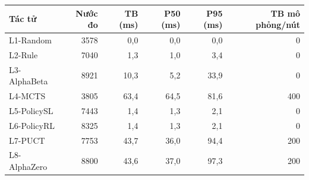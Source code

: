 \begin{center}\small
\begin{tabular}{@{}lrrrrr@{}}
\toprule
Tác tử & Nước đo & TB (ms) & P50 (ms) & P95 (ms) & TB mô phỏng/nút \\
\midrule
L1-Random & 3578 & 0,0 & 0,0 & 0,0 & 0 \\
L2-Rule & 7040 & 1,3 & 1,0 & 3,4 & 0 \\
L3-AlphaBeta & 8921 & 10,3 & 5,2 & 33,9 & 0 \\
L4-MCTS & 3805 & 63,4 & 64,5 & 81,6 & 400 \\
L5-PolicySL & 7443 & 1,4 & 1,3 & 2,1 & 0 \\
L6-PolicyRL & 8325 & 1,4 & 1,3 & 2,1 & 0 \\
L7-PUCT & 7753 & 43,7 & 36,0 & 94,4 & 200 \\
L8-AlphaZero & 8800 & 43,6 & 37,0 & 97,3 & 200 \\
\bottomrule
\end{tabular}
\end{center}